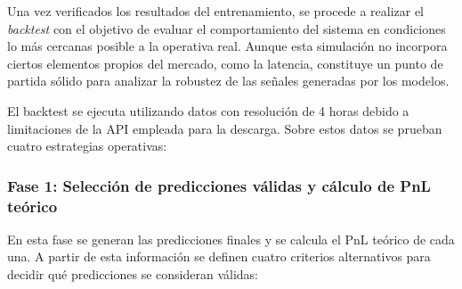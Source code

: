 Una vez verificados los resultados del entrenamiento, se procede a realizar el \textit{backtest} con el objetivo de evaluar el comportamiento del
sistema en condiciones lo más cercanas posible a la operativa real. Aunque esta simulación no incorpora ciertos elementos propios del mercado, como la
latencia, constituye un punto de partida sólido para analizar la robustez de las señales generadas por los modelos.

El backtest se ejecuta utilizando datos con resolución de 4 horas debido a limitaciones de la API empleada para la descarga. Sobre estos datos se
prueban cuatro estrategias operativas:

\subsubsection{Fase 1: Selección de predicciones válidas y cálculo de PnL teórico}

En esta fase se generan las predicciones finales y se calcula el PnL teórico de cada una. A partir de esta información se definen cuatro criterios
alternativos para decidir qué predicciones se consideran válidas:

\setlength{\LTleft}{-20cm plus 1fill}
\setlength{\LTright}{-20cm plus 1fill}

